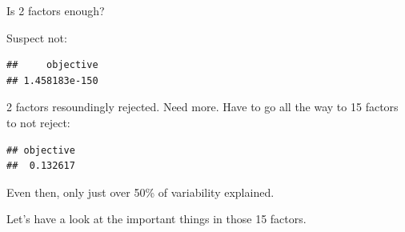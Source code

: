 \documentclass[ignorenonframetext,]{beamer}
\newenvironment{Shaded}{\begin{snugshade}}{\end{snugshade}}
\newcommand{\DataTypeTok}[1]{\textcolor[rgb]{0.13,0.29,0.53}{#1}}
\newcommand{\DecValTok}[1]{\textcolor[rgb]{0.00,0.00,0.81}{#1}}
\newcommand{\FloatTok}[1]{\textcolor[rgb]{0.00,0.00,0.81}{#1}}
\newcommand{\KeywordTok}[1]{\textcolor[rgb]{0.13,0.29,0.53}{\textbf{#1}}}
\newcommand{\NormalTok}[1]{#1}
\newcommand{\OperatorTok}[1]{\textcolor[rgb]{0.81,0.36,0.00}{\textbf{#1}}}
\newcommand{\StringTok}[1]{\textcolor[rgb]{0.31,0.60,0.02}{#1}}
\begin{document}
\begin{frame}[fragile]{Is 2 factors enough?}
\protect\hypertarget{is-2-factors-enough}{}

Suspect not:

\begin{Shaded}
\end{Shaded}

\begin{verbatim}
##     objective 
## 1.458183e-150
\end{verbatim}

2 factors resoundingly rejected. Need more. Have to go all the way to 15
factors to not reject:

\begin{Shaded}
\end{Shaded}

\begin{verbatim}
## objective 
##  0.132617
\end{verbatim}

Even then, only just over 50\% of variability explained.

Let's have a look at the important things in those 15 factors.

\end{frame}
\end{document}
